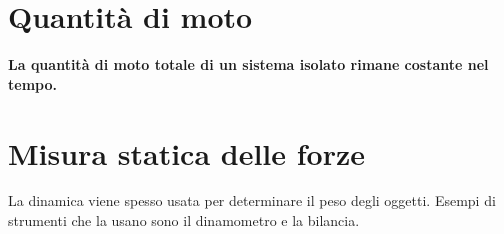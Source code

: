 \documentclass[a4paper,10pt]{article}
\begin{document}
\section{Quantità di moto}
\textbf{La quantità di moto totale di un sistema isolato rimane costante nel tempo.}

\section{Misura statica delle forze}
La dinamica viene spesso usata per determinare il peso degli oggetti. Esempi di strumenti che la usano sono il dinamometro e la bilancia.
\end{document}
